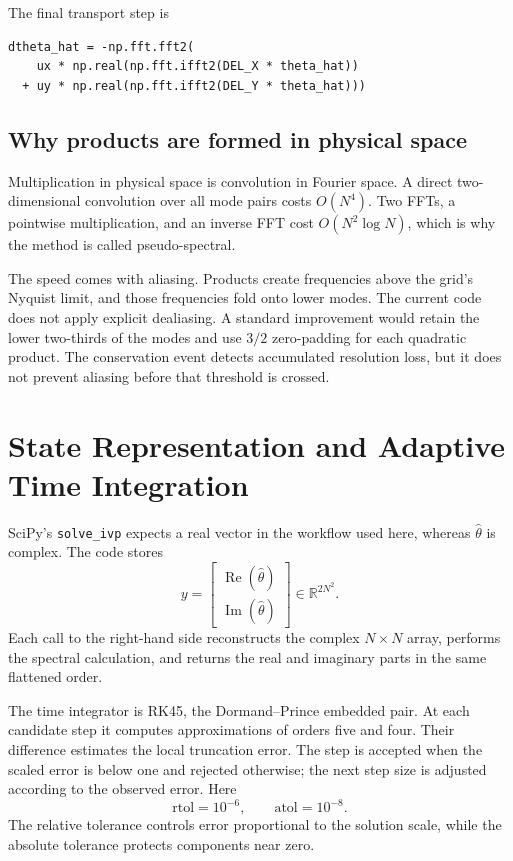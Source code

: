\documentclass[12pt,a4paper]{article}
\newcommand{\Real}{\mathbb{R}}
\theoremstyle{definition}
\begin{document}
The final transport step is
\begin{lstlisting}[style=python]
dtheta_hat = -np.fft.fft2(
    ux * np.real(np.fft.ifft2(DEL_X * theta_hat))
  + uy * np.real(np.fft.ifft2(DEL_Y * theta_hat)))
\end{lstlisting}

\subsection{Why products are formed in physical space}

Multiplication in physical space is convolution in Fourier space. A direct
two-dimensional convolution over all mode pairs costs $O(N^4)$. Two FFTs,
a pointwise multiplication, and an inverse FFT cost $O(N^2\log N)$, which
is why the method is called pseudo-spectral.

The speed comes with aliasing. Products create frequencies above the grid's
Nyquist limit, and those frequencies fold onto lower modes. The current code
does not apply explicit dealiasing. A standard improvement would retain the
lower two-thirds of the modes and use $3/2$ zero-padding for each quadratic
product. The conservation event detects accumulated resolution loss, but it
does not prevent aliasing before that threshold is crossed.

\section{State Representation and Adaptive Time Integration}

SciPy's \texttt{solve\_ivp} expects a real vector in the workflow used here,
whereas $\widehat\theta$ is complex. The code stores
\begin{equation}
  y=\begin{bmatrix}
     \operatorname{Re}(\widehat\theta)\\
     \operatorname{Im}(\widehat\theta)
  \end{bmatrix}\in\Real^{2N^2}.
\end{equation}
Each call to the right-hand side reconstructs the complex $N\times N$
array, performs the spectral calculation, and returns the real and imaginary
parts in the same flattened order.

The time integrator is RK45, the Dormand--Prince embedded pair. At each
candidate step it computes approximations of orders five and four. Their
difference estimates the local truncation error. The step is accepted when
the scaled error is below one and rejected otherwise; the next step size is
adjusted according to the observed error. Here
\begin{equation}
  \mathrm{rtol}=10^{-6},\qquad \mathrm{atol}=10^{-8}.
\end{equation}
The relative tolerance controls error proportional to the solution scale,
while the absolute tolerance protects components near zero.
\end{document}
